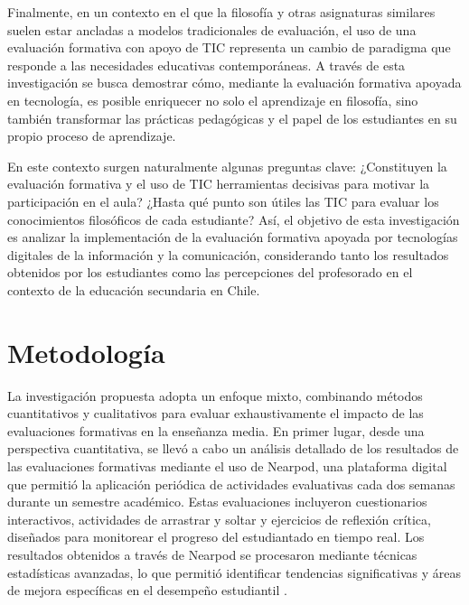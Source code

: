 \documentclass[spanish]{textolivre}
\begin{document}
Finalmente, en un contexto en el que la filosofía y otras asignaturas similares suelen estar ancladas a modelos tradicionales de evaluación, el uso de una evaluación formativa con apoyo de TIC representa un cambio de paradigma que responde a las necesidades educativas contemporáneas. A través de esta investigación se busca demostrar cómo, mediante la evaluación formativa apoyada en tecnología, es posible enriquecer no solo el aprendizaje en filosofía, sino también transformar las prácticas pedagógicas y el papel de los estudiantes en su propio proceso de aprendizaje.

En este contexto surgen naturalmente algunas preguntas clave: ¿Constituyen la evaluación formativa y el uso de TIC herramientas decisivas para motivar la participación en el aula? ¿Hasta qué punto son útiles las TIC para evaluar los conocimientos filosóficos de cada estudiante? Así, el objetivo de esta investigación es analizar la implementación de la evaluación formativa apoyada por tecnologías digitales de la información y la comunicación, considerando tanto los resultados obtenidos por los estudiantes como las percepciones del profesorado en el contexto de la educación secundaria en Chile.


\section{Metodología}
La investigación propuesta adopta un enfoque mixto, combinando métodos cuantitativos y cualitativos para evaluar exhaustivamente el impacto de las evaluaciones formativas en la enseñanza media. En primer lugar, desde una perspectiva cuantitativa, se llevó a cabo un análisis detallado de los resultados de las evaluaciones formativas mediante el uso de Nearpod, una plataforma digital que permitió la aplicación periódica de actividades evaluativas cada dos semanas durante un semestre académico. Estas evaluaciones incluyeron cuestionarios interactivos, actividades de arrastrar y soltar y ejercicios de reflexión crítica, diseñados para monitorear el progreso del estudiantado en tiempo real. Los resultados obtenidos a través de Nearpod se procesaron mediante técnicas estadísticas avanzadas, lo que permitió identificar tendencias significativas y áreas de mejora específicas en el desempeño estudiantil \cite{yazidi2023}.
\end{document}
